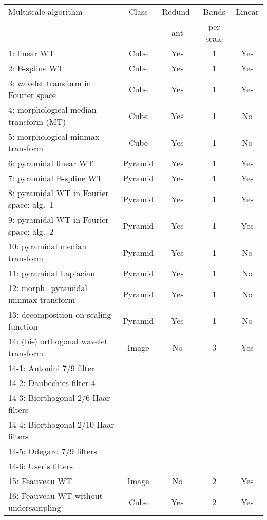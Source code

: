 \begin{table}
{\centering \begin{tabular}{|l|c|c|c|c|}
\hline 
Multiscale algorithm & Class & Redund- &  Bands  & Linear\\
                     &       & ant         & per scale  &  \\
\hline 
\hline 
1: linear WT & Cube & Yes & 1 & Yes \\ \hline 
2: B-spline WT & Cube & Yes & 1 & Yes \\ \hline 
3: wavelet transform in Fourier space & Cube & Yes & 1 & Yes \\ \hline
4: morphological median transform (MT) & Cube & Yes & 1 & No \\ \hline
5: morphological minmax transform & Cube & Yes & 1 & No \\ \hline
6: pyramidal linear WT & Pyramid & Yes & 1 & Yes \\ \hline
7: pyramidal B-spline WT & Pyramid & Yes & 1 & Yes \\ \hline
8: pyramidal WT in Fourier space: alg.\ 1  & Pyramid & Yes & 1 & Yes \\ \hline
9: pyramidal WT in Fourier space: alg.\ 2   & Pyramid & Yes & 1 & Yes \\ \hline
10: pyramidal median transform  & Pyramid & Yes & 1 & No \\ \hline
11: pyramidal Laplacian  & Pyramid & Yes & 1 & No \\ \hline
12: morph.\ pyramidal minmax transform  & Pyramid & Yes & 1 & No \\ \hline
13: decomposition on scaling function & Pyramid & Yes & 1 & No \\ \hline
14: (bi-) orthogonal wavelet transform & Image & No & 3 & Yes \\ 
14-1: Antonini 7/9 filter             &        &     &   &    \\
14-2: Daubechies filter 4             &        &     &   &    \\
14-3: Biorthogonal 2/6 Haar filters   &        &     &   &    \\
14-4: Biorthogonal 2/10 Haar filters  &        &     &   &     \\
14-5: Odegard 7/9 filters             &        &     &   &     \\
14-6: User's filters                  &        &     &   &     \\ \hline
15: Feauveau WT & Image & No & 2 & Yes \\ \hline
16: Feauveau WT without undersampling & Cube & Yes & 2 & Yes \\ \hline

\end{tabular}}
\end{table}

